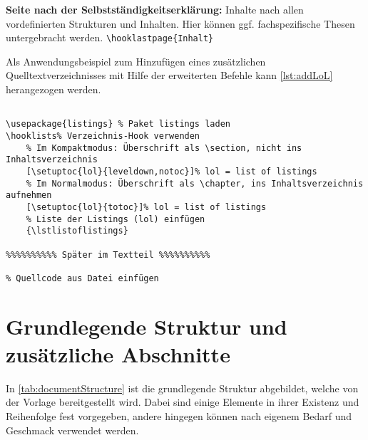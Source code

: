 \documentclass[
%
	thesis=paper,		%
	compactlistof,		%
	noauthorship,		%
%
	fancy,				%
%
%
]{hsmw-thesis}
\begin{document}
	\textbf{Seite nach der Selbstständigkeitserklärung:}\label{cmd:hooklastpage}
	Inhalte nach allen vordefinierten Strukturen und Inhalten.
	Hier können ggf. fachspezifische Thesen untergebracht werden.
	\newline
	\verb|\hooklastpage{Inhalt}|
	
	Als Anwendungsbeispiel zum Hinzufügen eines zusätzlichen Quelltextverzeichnisses mit Hilfe der erweiterten Befehle kann \cref{lst:addLoL} herangezogen werden.
	
	\begin{lstlisting}[float=htb,caption={Beispielcode zum Hinzufügen eines Quelltextverzeichnisses mit dem Paket \textit{listings}.},label=lst:addLoL]
%%%%%%%%%% In der Präambel %%%%%%%%%%

\usepackage{listings} % Paket listings laden
\hooklists% Verzeichnis-Hook verwenden
	% Im Kompaktmodus: Überschrift als \section, nicht ins Inhaltsverzeichnis
	[\setuptoc{lol}{leveldown,notoc}]% lol = list of listings
	% Im Normalmodus: Überschrift als \chapter, ins Inhaltsverzeichnis aufnehmen
	[\setuptoc{lol}{totoc}]% lol = list of listings
	% Liste der Listings (lol) einfügen
	{\lstlistoflistings}

%%%%%%%%%% Später im Textteil %%%%%%%%%%

% Quellcode aus Datei einfügen

	\end{lstlisting}
	
	
	
	\chapter{Grundlegende Struktur und zusätzliche Abschnitte}
	\label{cha:additionalChapters}
	
	In \cref{tab:documentStructure} ist die grundlegende Struktur abgebildet, welche von der Vorlage bereitgestellt wird.
	Dabei sind einige Elemente in ihrer Existenz und Reihenfolge fest vorgegeben, andere hingegen können nach eigenem Bedarf und Geschmack verwendet werden.
	
\end{document}
